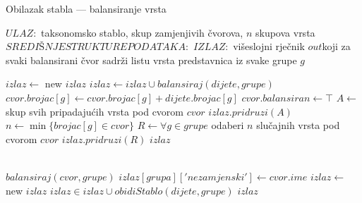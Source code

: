 \begin{algorithm}[h!]

\centering
\caption{Obilazak stabla --- balansiranje vrsta}
\label{algo:balance}

\begin{algorithmic}[1]

\State $ULAZ:$ taksonomsko stablo, skup zamjenjivih čvorova, $n$ skupova vrsta
\State $SREDIŠNJE STRUKTURE PODATAKA:$ %
\State $IZLAZ:$ višeslojni rječnik $out$koji za svaki balansirani čvor sadrži
listu vrsta predstavnica iz svake grupe $g$  

    \State $izlaz \gets$ new $izlaz$
        \State $izlaz \gets izlaz \cup balansiraj(dijete, grupe)$
                \State $cvor.brojac[g] \gets cvor.brojac[g] + dijete.brojac[g]$
            \EndFor
        \EndIf
    \EndFor
        \State $cvor.balansiran \gets \top$
            \State $A \gets$ skup svih pripadajućih vrsta pod cvorom $cvor$
            \State $izlaz.pridruzi(A)$
        \Else
            \State $n \gets \min\{brojac[g] \in cvor\}$
            \State $R \gets \forall g \in grupe$ odaberi $n$ slučajnih vrsta pod
cvorom $cvor$
            \State $izlaz.pridruzi(R)$
        \EndIf
    \EndIf
    \Return $izlaz$
\EndFunction

\end{algorithmic}
\end{algorithm}

\begin{algorithm}[h!]
\begin{algorithmic}[1]

     \\
        \Return $balansiraj(cvor, grupe)$
    \Else
                \State $izlaz[grupa]['nezamjenski'] \gets cvor.ime$
            \EndFor
        \Else
            \State $izlaz \gets$ new $izlaz$
                    \State $izlaz \in izlaz \cup obidiStablo(dijete, grupe)$
                \EndIf
            \EndFor
        \EndIf
    \EndIf
    \Return $izlaz$
\EndFunction

\end{algorithmic}
\end{algorithm}  
